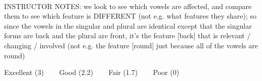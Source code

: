 \documentclass[12pt]{article}
\begin{document}
~\\
INSTRUCTOR NOTES: we look to see which vowels are affected, and compare them to see which feature is DIFFERENT (not e.g. what features they share); so since the vowels in the singular and plural are identical except that the singular forms are back and the plural are front, it's the feature [back] that is relevant / changing / involved (not e.g. the feature [round] just because all of the vowels are round)


\vfill
Excellent (3) ~~~ Good (2.2) ~~~ Fair (1.7) ~~~ Poor (0)
\newpage

\begin{center}
\textbf{{\color{red}{\HUGE END OF EXAM}}}\\

\end{center}
\newpage

\begin{center}
\textbf{{\color{blue}{\HUGE START OF EXAM\\}}}

\textbf{{\color{blue}{\HUGE Student ID: empty\\}}}

\textbf{{\color{blue}{\HUGE 4:30\\}}}

\end{center}
\newpage

\begin{center}
\textbf{{\color{blue}{\HUGE START OF EXAM\\}}}

\textbf{{\color{blue}{\HUGE Student ID: empty\\}}}

\textbf{{\color{blue}{\HUGE 4:40\\}}}

\end{center}
\newpage

\begin{center}
\textbf{{\color{blue}{\HUGE START OF EXAM\\}}}

\textbf{{\color{blue}{\HUGE Student ID: empty\\}}}

\textbf{{\color{blue}{\HUGE 4:50\\}}}

\end{center}
\newpage
\end{document}
